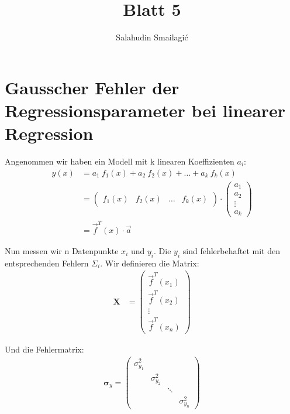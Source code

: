 \documentclass[11pt]{article}
\begin{document}
    \author{Salahudin Smailagić}
    \title{Blatt 5}

    \maketitle

    \section{Gausscher Fehler der Regressionsparameter bei linearer Regression}
    
    Angenommen wir haben ein Modell mit k linearen Koeffizienten $a_i$:
    \newcommand{\funcTrans}{\vec{f}^{T}}
    \newcommand{\aVec}{\vec{a}}
    \begin{align*}
        y(x) &= a_1 \ f_1(x) + a_2 \ f_2(x) + \dots + a_k \ f_k(x) \\
        &= \begin{pmatrix}
               f_1(x) & f_2(x) & \dots & f_k(x)
        \end{pmatrix} \cdot \begin{pmatrix}
                                a_1 \\
                                a_2 \\
                                \vdots \\
                                a_k
        \end{pmatrix} \\
        &= \funcTrans(x) \cdot \aVec
    \end{align*}
    
    Nun messen wir n Datenpunkte $x_i$ und $y_i$. Die $y_i$ sind fehlerbehaftet mit den entsprechenden Fehlern $\Sigma_i$.
    Wir definieren die Matrix:
    \newcommand{\yVec}{\vec{y}}
    \newcommand{\xMatrix}{\boldsymbol{X}}
    \newcommand{\xMatrixT}{\boldsymbol{X}^T}
    \begin{align*}
        \xMatrix &= \begin{pmatrix}
                        \funcTrans(x_1) \\
                        \funcTrans(x_2) \\
                        \vdots \\
                        \funcTrans(x_n)
        \end{pmatrix}
    \end{align*}
    
    Und die Fehlermatrix:
    \newcommand{\eMatrix}{\boldsymbol{\sigma}_{y}}
    \newcommand{\eMatrixInv}{\boldsymbol{W}}
    \begin{align*}
        \eMatrix = \begin{pmatrix}
                       \sigma_{y_1}^2 \\
                       & \sigma_{y_2}^2\\
                       & & \ddots\\
                       & & & \sigma_{y_n}^2
        \end{pmatrix}
    \end{align*}
    
\end{document}
